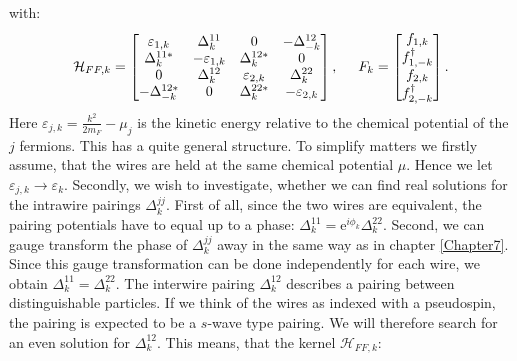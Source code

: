 with:
\begin{equation}
\mathcal{H}_{FF,k} = \begin{bmatrix} \varepsilon_{1,k} & \Delta^{11}_k      & 0                 & -\Delta^{12}_{-k} \\ 
                                     \Delta^{11 *}_k   & -\varepsilon_{1,k} & \Delta^{12*}_k    & 0 \\ 
                                    0                  & \Delta^{12}_k      & \varepsilon_{2,k} & \Delta^{22}_k \\ 
                                     -\Delta^{12*}_{-k}& 0                  & \Delta^{22*}_k    & -\varepsilon_{2,k} \end{bmatrix}, \hspace{0.5cm}
F_k =  \begin{bmatrix} f_{1,k} \\ f^\dagger_{1,-k} \\ f_{2,k} \\ f^\dagger_{2,-k} \end{bmatrix}.                                     
\end{equation}
Here $\varepsilon_{j,k} = \frac{k^2}{2m_F}-\mu_j$ is the kinetic energy relative to the chemical potential of the $j$ fermions. This has a quite general structure. To simplify matters we firstly assume, that the wires are held at the same chemical potential $\mu$. Hence we let $\varepsilon_{j,k} \to \varepsilon_k$. Secondly, we wish to investigate, whether we can find real solutions for the intrawire pairings $\Delta^{jj}_k$. First of all, since the two wires are equivalent, the pairing potentials have to equal up to a phase: $\Delta^{11}_k = \text{e}^{i\phi_k} \Delta^{22}_k$. Second, we can gauge transform the phase of $\Delta^{jj}_k$ away in the same way as in chapter \ref{Chapter7}. Since this gauge transformation can be done independently for each wire, we obtain $\Delta^{11}_k = \Delta^{22}_k$. The interwire pairing $\Delta^{12}_k$ describes a pairing between distinguishable particles. If we think of the wires as indexed with a pseudospin, the pairing is expected to be a $s$-wave type pairing. We will therefore search for an even solution for $\Delta^{12}_k$. This means, that the kernel $\mathcal{H}_{FF,k}$:
